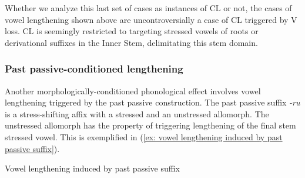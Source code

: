 Whether we analyze this last set of cases as instances of CL or not, the cases of vowel lengthening shown above are uncontroversially a case of CL triggered by V loss. CL is seemingly restricted to targeting stressed vowels of roots or derivational suffixes in the Inner Stem, delimitating this stem domain.

\subsubsection{Past passive-conditioned lengthening}
\label{subsubsec: past passive-conditioned lengthening}

Another morphologically-conditioned phonological effect involves vowel lengthening triggered by the past passive construction. The past passive suffix \textit{-ru} is a stress-shifting affix with a stressed and an unstressed allomorph. The unstressed allomorph has the property of triggering lengthening of the final stem stressed vowel. This is exemplified in (\ref{ex: vowel lengthening induced by past passive suffix}).

\ea\label{ex: vowel lengthening induced by past passive suffix}
{Vowel lengthening induced by past passive suffix }

    \z
\z

